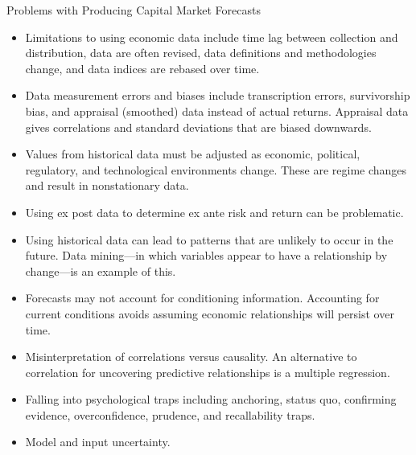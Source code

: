 \documentclass[../custom,grid]{flashcards}
\newcommand{\studyArea}{Capital Market Expectations}
\begin{document}
\begin{flashcard}[\studyArea]{Problems with Producing Capital Market Forecasts}
    \begin{itemize}[itemsep=.2\itemsep]
        \item Limitations to using economic data include time lag between collection and distribution, data are often revised, data definitions and methodologies change, and data indices are rebased over time.
        \item Data measurement errors and biases include transcription errors, survivorship bias, and appraisal (smoothed) data instead of actual returns. Appraisal data gives correlations and standard deviations that are biased downwards.
        \item Values from historical data must be adjusted as economic, political, regulatory, and technological environments change. These are regime changes and result in nonstationary data.
        \item Using ex post data to determine ex ante risk and return can be problematic.
        \item Using historical data can lead to patterns that are unlikely to occur in the future. Data mining---in which variables appear to have a relationship by change---is an example of this.
        \item Forecasts may not account for conditioning information. Accounting for current conditions avoids assuming economic relationships will persist over time.
        \item Misinterpretation of correlations versus causality. An alternative to correlation for uncovering predictive relationships is a multiple regression.
        \item Falling into psychological traps including anchoring, status quo, confirming evidence, overconfidence, prudence, and recallability traps.
        \item Model and input uncertainty.
    \end{itemize}
\end{flashcard}
\end{document}
